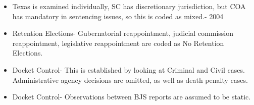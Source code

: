 \documentclass[12pt]{article}
\begin{document}
\begin{itemize}
\item Texas is examined individually, SC has discretionary jurisdiction, but COA has mandatory in sentencing issues, so this is coded as mixed.- 2004

\item Retention Elections- Gubernatorial reappointment, judicial commission reappointment, legislative reappointment are coded as No Retention Elections.

\item Docket Control- This is established by looking at Criminal and Civil cases.  Administrative agency decisions are omitted, as well as death penalty cases.

\item Docket Control- Observations between BJS reports are assumed to be static.
\end{itemize}
\end{document}
